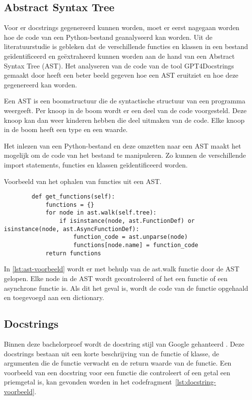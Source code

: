 \subsection{Abstract Syntax Tree}
\label{sec:bestanddocumentatie-ast}
Voor er docstrings gegenereerd kunnen worden, moet er eerst nagegaan worden hoe de code van een Python-bestand geanalyseerd kan worden.
Uit de literatuurstudie is gebleken dat de verschillende functies en klassen in een bestand geïdentificeerd en geëxtraheerd kunnen worden aan de hand van een Abstract Syntax Tree (AST).
Het analyseren van de code van de tool GPT4Docstrings gemaakt door \textcite{Trofficus2023} heeft een beter beeld gegeven hoe een AST eruitziet en hoe deze gegenereerd kan worden.

Een AST is een boomstructuur die de syntactische structuur van een programma weergeeft.
Per knoop in de boom wordt er een deel van de code voorgesteld. 
Deze knoop kan dan weer kinderen hebben die deel uitmaken van de code.
Elke knoop in de boom heeft een type en een waarde.

Het inlezen van een Python-bestand en deze omzetten naar een AST maakt het mogelijk om de code van het bestand te manipuleren.
Zo kunnen de verschillende import statements, functies en klassen geïdentificeerd worden.

\begin{listing}
    \caption[Ophalen functies uit AST]{Voorbeeld van het ophalen van functies uit een AST.}
    \label{lst:ast-voorbeeld}
    \begin{verbatim}
        def get_functions(self):
            functions = {}
            for node in ast.walk(self.tree):
                if isinstance(node, ast.FunctionDef) or isinstance(node, ast.AsyncFunctionDef):
                    function_code = ast.unparse(node)
                    functions[node.name] = function_code
            return functions
    \end{verbatim}
\end{listing}

In \ref{lst:ast-voorbeeld} wordt er met behulp van de ast.walk functie door de AST gelopen.
Elke node in de AST wordt gecontroleerd of het een functie of een asynchrone functie is.
Als dit het geval is, wordt de code van de functie opgehaald en toegevoegd aan een dictionary.

\subsection{Docstrings}
\label{sec:bestanddocumentatie-docstrings}
Binnen deze bachelorproef wordt de docstring stijl van Google gehanteerd \autocite{GPT2024}.
Deze docstrings bestaan uit een korte beschrijving van de functie of klasse, de argumenten die de functie verwacht en de return waarde van de functie.
Een voorbeeld van een docstring voor een functie die controleert of een getal een priemgetal is, kan gevonden worden in het codefragment~\ref{lst:docstring-voorbeeld}.

